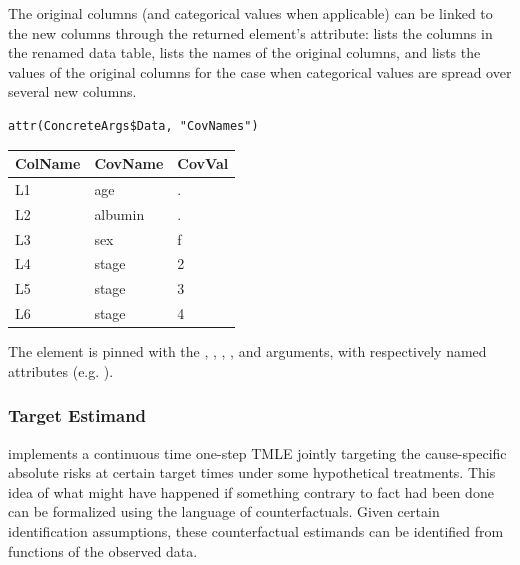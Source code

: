 \documentclass{report}
\newcommand{\1}{\ensuremath{\mathbf{1}}}
\begin{document}
The original columns (and categorical values when applicable) can be linked to the new columns through the returned  element's  attribute:  lists the columns in the renamed data table,  lists the names of the original columns, and  lists the values of the original columns for the case when categorical values are spread over several new columns.   

\begin{lstlisting}
attr(ConcreteArgs$Data, "CovNames")
\end{lstlisting}

\begin{center}
\begin{tabular}{lll}
ColName & CovName & CovVal\\
\hline
L1 & age & .\\
L2 & albumin & .\\
L3 & sex & f\\
L4 & stage & 2\\
L5 & stage & 3\\
L6 & stage & 4\\
\end{tabular}
\end{center}

The  element is pinned with the , , , , and  arguments, with respectively named attributes (e.g. ).

\subsubsection{Target Estimand}
\label{Estimand}
 implements a continuous time one-step TMLE jointly targeting the cause-specific absolute risks at certain target times under some hypothetical treatments. This idea of what might have happened if something contrary to fact had been done can be formalized using the language of counterfactuals. Given certain identification assumptions, these counterfactual estimands can be identified from functions of the observed data.
\end{document}

